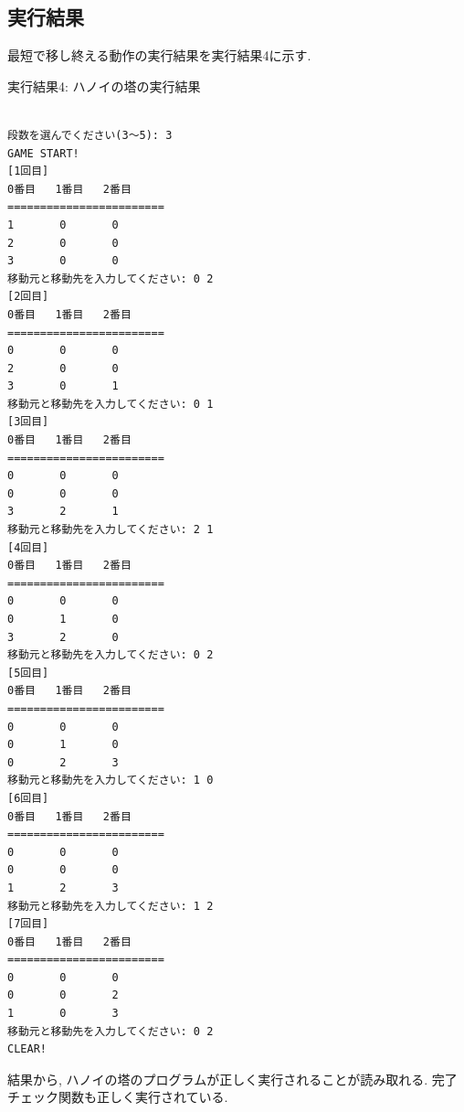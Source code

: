 \documentclass[a4j]{jsarticle}
\begin{document}
    \subsection{実行結果}
        最短で移し終える動作の実行結果を実行結果4に示す. 
        \begin{breakitembox}[l]{実行結果4: ハノイの塔の実行結果}
        \begin{verbatim}

段数を選んでください(3〜5): 3
GAME START!
[1回目]
0番目   1番目   2番目
========================
1       0       0
2       0       0
3       0       0
移動元と移動先を入力してください: 0 2
[2回目]
0番目   1番目   2番目
========================
0       0       0
2       0       0
3       0       1
移動元と移動先を入力してください: 0 1
[3回目]
0番目   1番目   2番目
========================
0       0       0
0       0       0
3       2       1
移動元と移動先を入力してください: 2 1
[4回目]
0番目   1番目   2番目
========================
0       0       0
0       1       0
3       2       0
移動元と移動先を入力してください: 0 2
[5回目]
0番目   1番目   2番目
========================
0       0       0
0       1       0
0       2       3
移動元と移動先を入力してください: 1 0
[6回目]
0番目   1番目   2番目
========================
0       0       0
0       0       0
1       2       3
移動元と移動先を入力してください: 1 2
[7回目]
0番目   1番目   2番目
========================
0       0       0
0       0       2
1       0       3
移動元と移動先を入力してください: 0 2
CLEAR!
        \end{verbatim}
        \end{breakitembox}
        結果から, ハノイの塔のプログラムが正しく実行されることが読み取れる. 完了チェック関数も正しく実行されている. 
                
\end{document}
